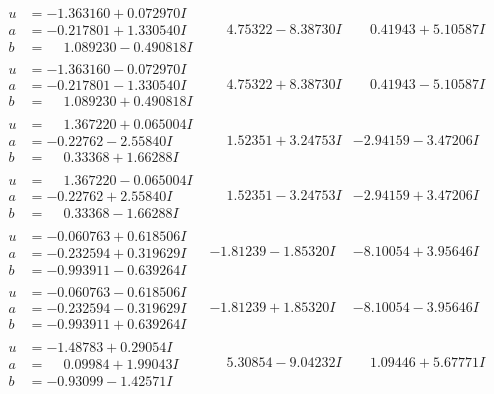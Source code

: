 \documentclass[1p]{elsarticle_modified}
\theoremstyle{definition}
\begin{document}
$$\begin{array}{c|c|c}
\begin{aligned}
u &= -1.363160 + 0.072970 I \\
a &= -0.217801 + 1.330540 I \\
b &= \phantom{-}1.089230 - 0.490818 I\end{aligned}
 & \phantom{-}4.75322 - 8.38730 I & \phantom{-}0.41943 + 5.10587 I \\ \hline\begin{aligned}
u &= -1.363160 - 0.072970 I \\
a &= -0.217801 - 1.330540 I \\
b &= \phantom{-}1.089230 + 0.490818 I\end{aligned}
 & \phantom{-}4.75322 + 8.38730 I & \phantom{-}0.41943 - 5.10587 I \\ \hline\begin{aligned}
u &= \phantom{-}1.367220 + 0.065004 I \\
a &= -0.22762 - 2.55840 I \\
b &= \phantom{-}0.33368 + 1.66288 I\end{aligned}
 & \phantom{-}1.52351 + 3.24753 I & -2.94159 - 3.47206 I \\ \hline\begin{aligned}
u &= \phantom{-}1.367220 - 0.065004 I \\
a &= -0.22762 + 2.55840 I \\
b &= \phantom{-}0.33368 - 1.66288 I\end{aligned}
 & \phantom{-}1.52351 - 3.24753 I & -2.94159 + 3.47206 I \\ \hline\begin{aligned}
u &= -0.060763 + 0.618506 I \\
a &= -0.232594 + 0.319629 I \\
b &= -0.993911 - 0.639264 I\end{aligned}
 & -1.81239 - 1.85320 I & -8.10054 + 3.95646 I \\ \hline\begin{aligned}
u &= -0.060763 - 0.618506 I \\
a &= -0.232594 - 0.319629 I \\
b &= -0.993911 + 0.639264 I\end{aligned}
 & -1.81239 + 1.85320 I & -8.10054 - 3.95646 I \\ \hline\begin{aligned}
u &= -1.48783 + 0.29054 I \\
a &= \phantom{-}0.09984 + 1.99043 I \\
b &= -0.93099 - 1.42571 I\end{aligned}
 & \phantom{-}5.30854 - 9.04232 I & \phantom{-}1.09446 + 5.67771 I \\ \hline\begin{aligned}

\end{aligned}
\end{array}$$
\end{document}

